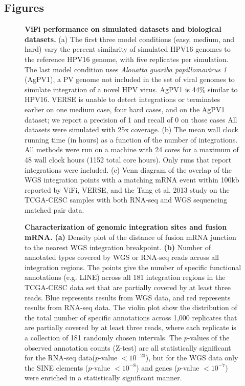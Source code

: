 \documentclass{bmcart}
\def\texttt{[image: ]}
\begin{document}
\begin{backmatter}

\section*{Figures}
 \begin{figure}[htpb]
  \centering
\caption[ViFi performance simulated datasets.]  {\label{sim_results}
  {\bf ViFi performance on simulated datasets and biological
    datasets.}  (a) The first three model conditions (easy, medium,
  and hard) vary the percent similarity of simulated HPV16 genomes to
  the reference HPV16 genome, with five replicates per simulation.
  The last model condition uses \textit{Alouatta guariba
    papillomavirus 1} (AgPV1), a PV genome not included in the set of
  viral genomes to simulate integration of a novel HPV virus.  AgPV1 is
  44\% similar to HPV16.  VERSE is unable to detect integrations or
  terminates earlier on one medium case, four hard cases, and on the
  AgPV1 dataset; we report a precision of 1 and recall of 0 on those
  cases  All datasets were simulated with 25x coverage.  (b) The mean wall clock running time
  (in hours) as a function of the number of integrations.  All methods
  were run on a machine with 24 cores for a maximum of 48 wall clock hours (1152 total core hours).  Only
  runs that report integrations were included.  (c) Venn diagram of
  the overlap of the WGS integration points with a matching mRNA event
  within 100kb reported by ViFi, VERSE, and the Tang et al. 2013 study
  on the TCGA-CESC samples with both RNA-seq and WGS sequencing
  matched pair data.}
\end{figure}


\begin{figure}[htpb]
  \centering
  \caption[Analyses of genomic integration sites.]  {\label{figure2}
    \textbf{Characterization of genomic integration sites and fusion
      mRNA.} \textbf{(a)} Density plot of the distance of fusion mRNA
    junction to the nearest WGS integration breakpoint.  \textbf{(b)}
    Number of annotated types covered by WGS or RNA-seq reads across
    all integration regions.  The points give
    the number of specific functional annotations (e.g. LINE) across
    all 181 integration regions in the TCGA-CESC data set that
    are partially covered by at least three reads.  Blue represents
    results from WGS data, and red represents results from RNA-seq
    data.  The violin plot show the distribution of the total number
    of specific annotations across 1,000 replicates that are partially
    covered by at least three reads, where each replicate is a
    collection of 181 randomly chosen intervals. The $p$-values of the
    observed annotation counts (Z-test) are all statistically
    significant for the RNA-seq data($p$-value $<10^{-20}$), but for the
    WGS data only the SINE elements ($p$-value $<10^{-8}$) and genes
    ($p$-value $<10^{-7}$) were enriched in a statistically significant
    manner.}
\end{figure}


\end{backmatter}
\end{document}
